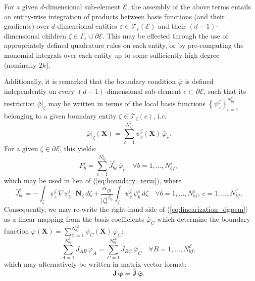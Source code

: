 	For a given $d$-dimensional sub-element $\mathcal{E}$, the assembly of the above terms entails an entity-wise integration of products between basis functions (and their gradients) over $d$-dimensional entities $\varepsilon \in \mathcal{T}_\varepsilon (\mathcal{E})$ and their $(d-1)$-dimensional children $\zeta \in \Gamma_\varepsilon \cup \partial \mathcal{E}$. This may be effected through the use of appropriately defined quadrature rules on each entity, or by pre-computing the monomial integrals over each entity up to some sufficiently high degree (nominally $2k$).
	
	Additionally, it is remarked that the boundary condition $\bar{\varphi}$ is defined independently on every $(d-1)$-dimensional sub-element $e \subset \partial \mathcal{E}$, such that its restriction $\bar{\varphi}|_\zeta$ may be written in terms of the local basis functions $\left\{ \psi^{\zeta}_c \right\}_{c=1}^{N^\zeta_{bf}}$ belonging to a given boundary entity $\zeta \in \mathcal{T}_{\zeta} (e)$, i.e.
	\begin{equation}
			\bar{\varphi}|_\zeta (\mathbf{X}) = \sum_{c=1}^{N^\zeta_{bf}} \psi^\zeta_c (\mathbf{X}) \, \bar{\varphi}_c.
	\end{equation}
	For a given $\zeta \in \partial \mathcal{E}$, this yields:
	\begin{equation}
		F^{\varepsilon}_b = \sum_{c=1}^{N^\zeta_{bf}} \bar{J}^{\varepsilon}_{bc} \, \bar{\varphi}_c \quad \forall b = 1, \ldots, N^{\varepsilon}_{bf},
	\end{equation}
	which may be used in lieu of (\ref{eq:boundary_term}), where
	\begin{equation}
		\bar{J}^{\varepsilon}_{bc} = - \int_{\zeta} \psi^\zeta_c \, \nabla \psi_b^{\varepsilon} \cdot \mathbf{N}_{\zeta} \, d \zeta + \frac{\alpha_{\zeta0}}{|\zeta|^{\beta_0}} \int_{\zeta} \psi^\zeta_c \, \psi_b^{\varepsilon} \, d \zeta \quad \forall b = 1, \ldots, N^{\varepsilon}_{bf}, \, c = 1, \ldots, N^\zeta_{bf}.
	\end{equation}
	Consequently, we may re-write the right-hand side of (\ref{eq:linearization_dgpem}) as a linear mapping from the basis coefficients $\bar{\varphi}_C$ which determine the boundary function $\bar{\varphi} (\mathbf{X}) = \sum_{C=1}^{N^{\partial \mathcal{E}}_{bf}} \psi_C (\mathbf{X}) \, \bar{\varphi}_C$:
	\begin{equation}
		\sum_{A=1}^{N^{\mathcal{E}}_{bf}} J_{AB} \, \varphi_A = \sum_{C=1}^{N^{\partial \mathcal{E}}_{bf}} \bar{J}_{BC} \, \bar{\varphi}_C \quad \forall B = 1, \ldots, N^{\mathcal{E}}_{bf},
	\end{equation}
	which may alternatively be written in matrix-vector format:
	\begin{equation}
		\mathbf{J} \, \boldsymbol{\varphi} = \bar{\mathbf{J}} \, \bar{\boldsymbol{\varphi}}.
	\end{equation}
	
